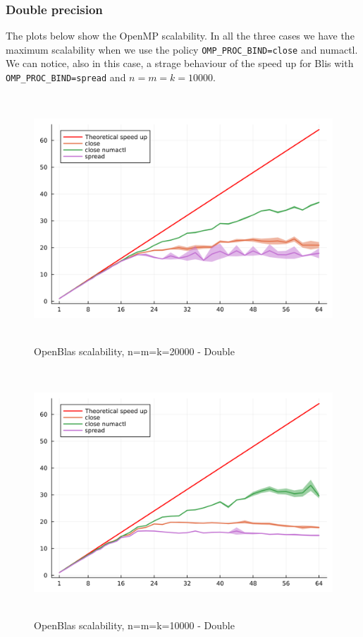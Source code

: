 \documentclass[
  letterpaper,
  DIV=11,
  numbers=noendperiod]{scrartcl}
\begin{document}
\newpage

\hypertarget{double-precision-1}{%
\subsubsection{Double precision}\label{double-precision-1}}

The plots below show the OpenMP scalability. In all the three cases we
have the maximum scalability when we use the policy
\texttt{OMP\_PROC\_BIND=close} and numactl. We can notice, also in this
case, a strage behaviour of the speed up for Blis with
\texttt{OMP\_PROC\_BIND=spread} and \(n=m=k=10000\).

\begin{figure}

{\centering \includegraphics[width=\textwidth,height=3.64583in]{img/oblas_scalability_double_20000.png}

}

\caption{OpenBlas scalability, n=m=k=20000 - Double}

\end{figure}

\begin{figure}

{\centering \includegraphics[width=\textwidth,height=3.64583in]{img/oblas_scalability_double_10000.png}

}

\caption{OpenBlas scalability, n=m=k=10000 - Double}

\end{figure}
\end{document}
